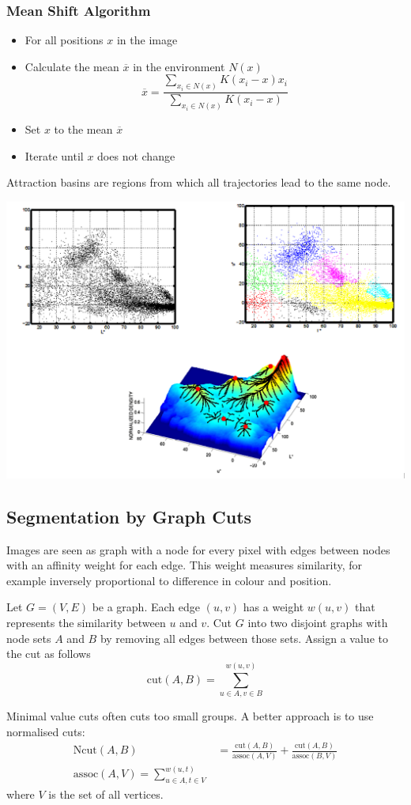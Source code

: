 \documentclass[11pt]{article}
\theoremstyle{definition}
\newcommand*\samplemean[1]{\overline{#1}}
\begin{document}
\subsubsection{Mean Shift Algorithm}
\begin{itemize}[label=-]
	\item[] For all positions $x$ in the image
	\item Calculate the mean $\samplemean{x}$ in the environment $N(x)$
	\begin{equation*}
		\samplemean{x} = \frac{\sum_{x_i \in N(x)} K(x_i - x) x_i }{\sum_{x_i \in N(x)} K(x_i - x)}
	\end{equation*}
	\item Set $x$ to the mean $\samplemean{x}$
	\item Iterate until $x$ does not change
\end{itemize}
Attraction basins are regions from which all trajectories lead to the same node.
\begin{center}
	\includegraphics[width=0.7\linewidth]{img/attraction_basins}
\end{center}

\subsection{Segmentation by Graph Cuts}
Images are seen as graph with a node for every pixel with edges between nodes with an affinity weight for each edge. This weight  measures similarity, for example inversely proportional to difference in colour and position.
\begin{definition}
	Let $G=(V,E)$ be a graph. Each edge $(u,v)$ has a weight $w(u,v)$ that represents the similarity between $u$ and $v$. Cut $G$ into two disjoint graphs with node sets $A$ and $B$ by removing all edges between those sets. Assign a value to the cut as follows
	\begin{equation*}
		\text{cut}(A,B) = \sum_{u\in A,v\in B}^{w(u,v)}
	\end{equation*}
\end{definition}
Minimal value cuts often cuts too small groups. A better approach is to use normalised cuts:
\begin{align*}
	\text{Ncut}(A,B) &= \frac{\text{cut}(A,B)}{\text{assoc}(A,V)} + \frac{\text{cut}(A,B)}{\text{assoc}(B,V)}\\
	\text{assoc}(A,V) = \sum_{u\in A, t\in V}^{w(u,t)}
\end{align*}
where $V$ is the set of all vertices.
\end{document}
